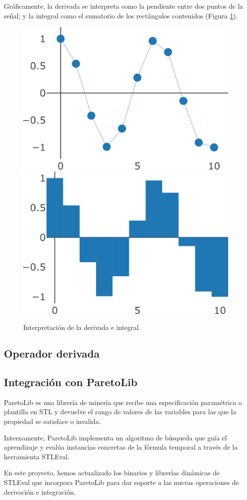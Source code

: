Gráficamente, la derivada se interpreta como la pendiente entre dos puntos de la señal; y la integral como el sumatorio de los rectángulos contenidos (Figura \ref{fig:der_int}).

\begin{figure}
\centering
  \includegraphics[width=.4\linewidth]{images/derivada} \hfill
  \includegraphics[width=.4\linewidth]{images/integral}
\caption{Interpretación de la derivada e integral.}
\label{fig:der_int}
\end{figure}


\subsection{Operador derivada}

\subsection{Integración con ParetoLib}
ParetoLib \cite{FORMATS_19, ParetoLib} es una librería de minería que recibe una especificación paramétrica o plantilla en STL y devuelve el rango de valores de las variables para las que la propiedad se satisface o invalida. 

Internamente, ParetoLib implementa un algoritmo de búsqueda que guía el aprendizaje y evalúa instancias concretas de la fórmula temporal a través de la herramienta STLEval.

En este proyecto, hemos actualizado los binarios y librerías dinámicas de STLEval que incorpora ParetoLib para dar soporte a las nuevas operaciones de derivación e integración. 

